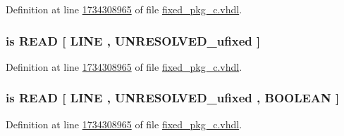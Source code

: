 Definition at line \hyperlink{fixed__pkg__c_8vhdl_source_l1734308965}{1734308965} of file \hyperlink{fixed__pkg__c_8vhdl_source}{fixed\+\_\+pkg\+\_\+c.\+vhdl}.

\hypertarget{classfixed__pkg_ad42b366c3257a3dc2dc2e77d106f4fbe}{}
\subsubsection[{bread}]{ {\bfseries \textcolor{keywordflow}{is}\textcolor{vhdlchar}{ }\textcolor{vhdlchar}{R\+E\+A\+D}\textcolor{vhdlchar}{ }\textcolor{vhdlchar}{\mbox{[}}\textcolor{vhdlchar}{ }\textcolor{vhdlchar}{L\+I\+N\+E}\textcolor{vhdlchar}{ }\textcolor{vhdlchar}{,}\textcolor{vhdlchar}{ }{\bfseries {\bf U\+N\+R\+E\+S\+O\+L\+V\+E\+D\+\_\+ufixed}} \textcolor{vhdlchar}{ }\textcolor{vhdlchar}{\mbox{]}}\textcolor{vhdlchar}{ }} \hspace{0.3cm}{\ttfamily [Alias]}}\label{classfixed__pkg_ad42b366c3257a3dc2dc2e77d106f4fbe}


Definition at line \hyperlink{fixed__pkg__c_8vhdl_source_l1734308965}{1734308965} of file \hyperlink{fixed__pkg__c_8vhdl_source}{fixed\+\_\+pkg\+\_\+c.\+vhdl}.

\hypertarget{classfixed__pkg_a29a6e1741e0c9fa33a11a2e3c413b0c7}{}
\subsubsection[{bread}]{ {\bfseries \textcolor{keywordflow}{is}\textcolor{vhdlchar}{ }\textcolor{vhdlchar}{R\+E\+A\+D}\textcolor{vhdlchar}{ }\textcolor{vhdlchar}{\mbox{[}}\textcolor{vhdlchar}{ }\textcolor{vhdlchar}{L\+I\+N\+E}\textcolor{vhdlchar}{ }\textcolor{vhdlchar}{,}\textcolor{vhdlchar}{ }{\bfseries {\bf U\+N\+R\+E\+S\+O\+L\+V\+E\+D\+\_\+ufixed}} \textcolor{vhdlchar}{ }\textcolor{vhdlchar}{,}\textcolor{vhdlchar}{ }\textcolor{comment}{B\+O\+O\+L\+E\+A\+N}\textcolor{vhdlchar}{ }\textcolor{vhdlchar}{\mbox{]}}\textcolor{vhdlchar}{ }} \hspace{0.3cm}{\ttfamily [Alias]}}\label{classfixed__pkg_a29a6e1741e0c9fa33a11a2e3c413b0c7}


Definition at line \hyperlink{fixed__pkg__c_8vhdl_source_l1734308965}{1734308965} of file \hyperlink{fixed__pkg__c_8vhdl_source}{fixed\+\_\+pkg\+\_\+c.\+vhdl}.

